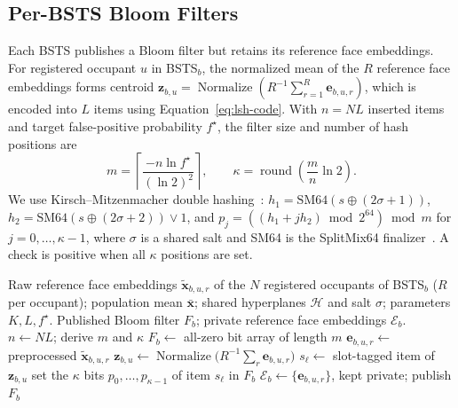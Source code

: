 \documentclass[pdflatex,sn-mathphys-num]{sn-jnl}%
\theoremstyle{thmstyleone}%
\theoremstyle{thmstyletwo}%
\theoremstyle{thmstylethree}%
\begin{document}
\subsection{Per-BSTS Bloom Filters}
Each BSTS publishes a Bloom filter but retains its reference face embeddings. For registered occupant $u$ in BSTS$_b$, the normalized mean of the $R$ reference face embeddings forms centroid $\mathbf{z}_{b,u}=\operatorname{Normalize}(R^{-1}\sum_{r=1}^{R}\mathbf{e}_{b,u,r})$, which is encoded into $L$ items using Equation~\ref{eq:lsh-code}. With $n=NL$ inserted items and target false-positive probability $f^\star$, the filter size and number of hash positions are
\begin{equation}
m=\left\lceil\frac{-n\ln f^\star}{(\ln2)^2}\right\rceil,\qquad
\kappa=\operatorname{round}\!\left(\frac{m}{n}\ln2\right).
\label{eq:bloom-size}
\end{equation}
We use Kirsch--Mitzenmacher double hashing~\cite{kirsch2006}: $h_1=\mathrm{SM64}(s\oplus(2\sigma+1))$, $h_2=\mathrm{SM64}(s\oplus(2\sigma+2))\vee1$, and $p_j=((h_1+jh_2)\bmod2^{64})\bmod m$ for $j=0,\ldots,\kappa-1$, where $\sigma$ is a shared salt and SM64 is the SplitMix64 finalizer~\cite{steele2014}. A check is positive when all $\kappa$ positions are set.

\begin{algorithm}[!t]
\footnotesize
\caption{Building the published Bloom filter at BSTS$_b$}
\label{alg:build}
\begin{algorithmic}[1]
\Require Raw reference face embeddings $\tilde{\mathbf{x}}_{b,u,r}$ of the $N$ registered occupants of BSTS$_b$ ($R$ per occupant);
\Statex population mean $\bar{\mathbf{x}}$; shared hyperplanes $\mathcal{H}$ and salt $\sigma$; parameters $K,L,f^\star$.
\Ensure Published Bloom filter $F_b$; private reference face embeddings $\mathcal{E}_b$.
\State $n\gets NL$; derive $m$ and $\kappa$ 
\State $F_b\gets$ all-zero bit array of length $m$
    \State $\mathbf{e}_{b,u,r}\gets$ preprocessed $\tilde{\mathbf{x}}_{b,u,r}$ 
  \EndFor
  \State $\mathbf{z}_{b,u}\gets\operatorname{Normalize}\bigl(R^{-1}\sum_{r}\mathbf{e}_{b,u,r}\bigr)$ 
    \State $s_\ell\gets$ slot-tagged item of $\mathbf{z}_{b,u}$ 
    \State set the $\kappa$ bits $p_0,\dots,p_{\kappa-1}$ of item $s_\ell$ in $F_b$ 
  \EndFor
\EndFor
\State $\mathcal{E}_b\gets\{\mathbf{e}_{b,u,r}\}$, kept private; publish $F_b$
\end{algorithmic}
\end{algorithm}
\end{document}
